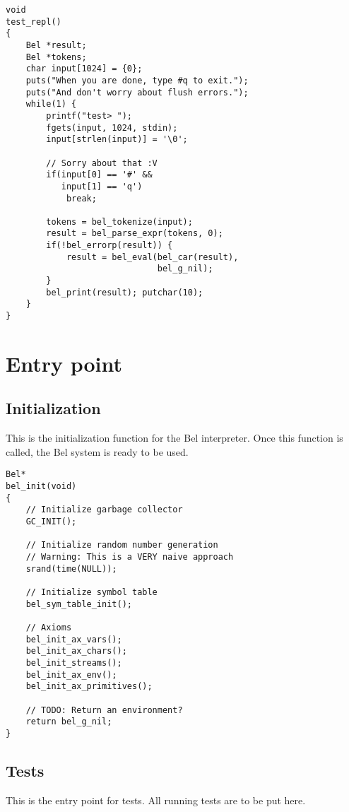 \documentclass[openright,a4paper,twoside,12pt]{memoir}
\begin{document}
\begin{verbatim}
void
test_repl()
{
    Bel *result;
    Bel *tokens;
    char input[1024] = {0};
    puts("When you are done, type #q to exit.");
    puts("And don't worry about flush errors.");
    while(1) {
        printf("test> ");
        fgets(input, 1024, stdin);
        input[strlen(input)] = '\0';

        // Sorry about that :V
        if(input[0] == '#' &&
           input[1] == 'q')
            break;

        tokens = bel_tokenize(input);
        result = bel_parse_expr(tokens, 0);
        if(!bel_errorp(result)) {
            result = bel_eval(bel_car(result),
                              bel_g_nil);
        }
        bel_print(result); putchar(10);
    }
}
\end{verbatim}

\chapter{Entry point}
\label{sec:org4ff3ce7}
\section{Initialization}
\label{sec:org6ed854d}

This is the initialization function for the Bel interpreter. Once this
function is called, the Bel system is ready to be used.

\begin{verbatim}
Bel*
bel_init(void)
{
    // Initialize garbage collector
    GC_INIT();

    // Initialize random number generation
    // Warning: This is a VERY naive approach
    srand(time(NULL));

    // Initialize symbol table
    bel_sym_table_init();

    // Axioms
    bel_init_ax_vars();
    bel_init_ax_chars();
    bel_init_streams();
    bel_init_ax_env();
    bel_init_ax_primitives();

    // TODO: Return an environment?
    return bel_g_nil;
}
\end{verbatim}

\section{Tests}
\label{sec:org131f9ac}

This is the entry point for tests. All running tests are to be put
here.
\end{document}
